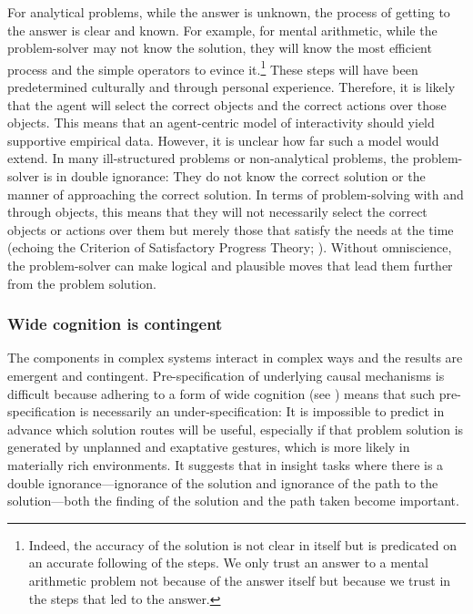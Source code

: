 \documentclass[twocolumn, serif, empirical, authordate]{jote-article}
\begin{document}
For analytical problems, while the answer is unknown, the process of getting to the answer is clear and known. For example, for mental arithmetic, while the problem-solver may not know the solution, they will know the most efficient process and the simple operators to evince it.\footnote{Indeed, the accuracy of the solution is not clear in itself but is predicated on an accurate following of the steps. We only trust an answer to a mental arithmetic problem not because of the answer itself but because we trust in the steps that led to the answer.} These steps will have been predetermined culturally and through personal experience. Therefore, it is likely that the agent will select the correct objects and the correct actions over those objects. This means that an agent-centric model of interactivity should yield supportive empirical data. However, it is unclear how far such a model would extend. In many ill-structured problems or non-analytical problems, the problem-solver is in double ignorance: They do not know the correct solution or the manner of approaching the correct solution. In terms of problem-solving with and through objects, this means that they will not necessarily select the correct objects or actions over them but merely those that satisfy the needs at the time (echoing the Criterion of Satisfactory Progress Theory; ). Without omniscience, the problem-solver can make logical and plausible moves that lead them further from the problem solution. 
\vskip2pt
\subsubsection*{Wide cognition is contingent}

The components in complex systems interact in complex ways and the results are emergent and contingent. Pre-specification of underlying causal mechanisms is difficult because adhering to a form of wide cognition (see ) means that such pre-specification is necessarily an under-specification: It is impossible to predict in advance which solution routes will be useful, especially if that problem solution is generated by unplanned and exaptative gestures, which is more likely in materially rich environments. It suggests that in insight tasks where there is a double ignorance---ignorance of the solution and ignorance of the path to the solution---both the finding of the solution and the path taken become important. 
\end{document}

